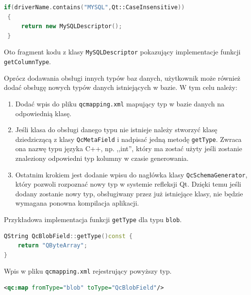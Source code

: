 \documentclass[12pt]{report}
\let\oldaddcontentsline\addcontentsline
\newcommand{\lstinputcplusplus}[2][]{{%
  \renewcommand{\lstlistingname}{C++ Code}%
  \renewcommand{\addcontentsline}[3]{\oldaddcontentsline{loc}{##2}{##3}}%
}}
\begin{document}
{\begin{framed}
\begin{lstlisting}[language=C++]
 if(driverName.contains("MYSQL",Qt::CaseInsensitive)) 
 {
     return new MySQLDescriptor();
 }
\end{lstlisting}
\end{framed}

Oto fragment kodu z klasy {\tt MySQLDescriptor} pokazujący implementacje funkcji {\tt getColumnType}.

\begin{framed}
\lstinputcplusplus[caption={QcSchemaGenerator}]{additional/mysqldescriptor.cpp}
\end{framed}

Oprócz dodawania obsługi innych typów baz danych, użytkownik może również dodać obsługę nowych typów danych istniejących w bazie. W tym celu należy:

\begin{enumerate}
\item{Dodać wpis do pliku {\tt qcmapping.xml} mapujący typ w bazie danych na odpo\-wiednią klasę.}
\item{Jeśli klasa do obsługi danego typu nie istnieje należy stworzyć klasę dziedzi\-czącą z klasy {\tt QcMetaField} i nadpisać jedną metodę {\tt getType}. Zwraca ona nazwę typu języka C++, np. ,,int'',  który ma zostać użyty jeśli zostanie znaleziony odpowiedni typ kolumny w czasie generowania.}
\item{Ostatnim krokiem jest dodanie wpisu do nagłówka klasy {\tt QcSchemaGenerator}, który pozwoli rozpoznać nowy typ w systemie refleksji Qt. Dzięki temu jeśli dodany zostanie nowy typ, obsługiwany przez już istniejące klasy, nie będzie wymagana ponowna kompilacja aplikacji.}
\end{enumerate}

Przykładowa implementacja funkcji {\tt getType} dla typu {\tt blob}.

\begin{framed}
\begin{lstlisting}[language=C++]
QString QcBlobField::getType()const {
    return "QByteArray";
}
\end{lstlisting}
\end{framed}

Wpis w pliku {\tt qcmapping.xml} rejestrujący powyższy typ.

\begin{framed}
\begin{lstlisting}[language=XML]
<qc:map fromType="blob" toType="QcBlobField"/>
\end{lstlisting}
\end{framed}

}
\end{document}
